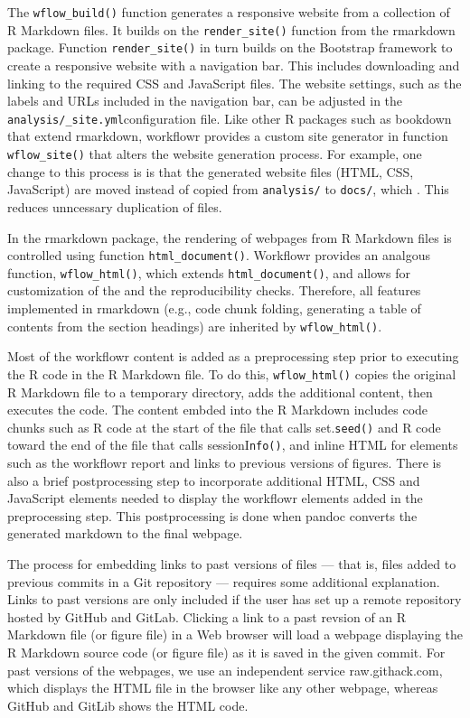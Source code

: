 \documentclass[9pt,a4paper]{extarticle}
\begin{document}
The \verb|wflow_build()| function generates a responsive website from a
collection of R Markdown files. It builds on the \verb|render_site()| function
from the rmarkdown package. Function \verb|render_site()| in turn builds on the
Bootstrap framework to create a responsive website with a navigation
bar. This includes downloading and linking to the required CSS and
JavaScript files. The website settings, such as the labels and URLs
included in the navigation bar, can be adjusted in the
\verb|analysis/_site.yml|configuration file. Like other R packages such
as bookdown that extend rmarkdown, workflowr provides a custom site
generator in function \verb|wflow_site()| that alters the website generation
process. For example, one change to this process is is that the
generated website files (HTML, CSS, JavaScript) are moved instead of
copied from \verb|analysis/| to \verb|docs/|, which . This reduces
unncessary duplication of files.

In the rmarkdown package, the rendering of webpages from R Markdown
files is controlled using function \verb|html_document()|. Workflowr provides
an analgous function, \verb|wflow_html()|, which extends \verb|html_document()|, and
allows for customization of the and the reproducibility checks.
Therefore, all features implemented in rmarkdown (e.g., code chunk
folding, generating a table of contents from the section headings) are
inherited by \verb|wflow_html()|.

Most of the workflowr content is added as a preprocessing step prior to
executing the R code in the R Markdown file. To do this, \verb|wflow_html()|
copies the original R Markdown file to a temporary directory, adds the
additional content, then executes the code. The content embded into the
R Markdown includes code chunks such as R code at the start of the file
that calls set.\verb|seed()| and R code toward the end of the file that calls
sessionI\verb|nfo()|, and inline HTML for elements such as the workflowr report
and links to previous versions of figures. There is also a brief
postprocessing step to incorporate additional HTML, CSS and JavaScript
elements needed to display the workflowr elements added in the
preprocessing step. This postprocessing is done when pandoc converts the
generated markdown to the final webpage.

The process for embedding links to past versions of files --- that is,
files added to previous commits in a Git repository --- requires some
additional explanation. Links to past versions are only included if the
user has set up a remote repository hosted by GitHub and GitLab.
Clicking a link to a past revsion of an R Markdown file (or figure file)
in a Web browser will load a webpage displaying the R Markdown source
code (or figure file) as it is saved in the given commit. For past
versions of the webpages, we use an independent service raw.githack.com,
which displays the HTML file in the browser like any other webpage,
whereas GitHub and GitLib shows the HTML code.
\end{document}
